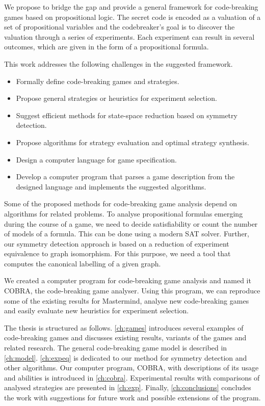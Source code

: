 We propose to bridge the gap and provide
  a general framework for code-breaking games
  based on propositional logic.
The secret code is encoded as a valuation of
  a set of propositional variables
  and the codebreaker's goal is to discover the valuation
  through a series of experiments.
Each experiment can result in several outcomes,
  which are given in the form of a propositional formula.

This work addresses the following challenges in the suggested framework.
\begin{itemize}
\item Formally define code-breaking games and strategies.
\item Propose general strategies or heuristics for experiment selection.
\item Suggest efficient methods for state-space reduction based on symmetry detection.
\item Propose algorithms for strategy evaluation and optimal strategy synthesis.
\item Design a computer language for game specification.
\item Develop a computer program that parses a game description from the
  designed language and implements the suggested algorithms.
\end{itemize}

Some of the proposed methods for code-breaking game analysis depend
  on algorithms for related problems.
To analyse propositional formulas emerging during the course of a game,
  we need to decide satisfiability or count the number of models of
  a formula. This can be done using a modern SAT solver.
Further, our symmetry detection approach is based on a reduction
  of experiment equivalence to graph isomorphism.
For this purpose, we need a tool that computes the canonical labelling of a
 given graph.

We created a computer program for code-breaking game analysis and named it COBRA,
  the code-breaking game analyser.
Using this program, we can reproduce some of the existing results
  for Mastermind, analyse new code-breaking games and easily evaluate new heuristics
  for experiment selection.

The thesis is structured as follows.
\autoref{ch:games} introduces several examples of code-breaking games and
  discusses existing results, variants of the games and related research.
The general code-breaking game model is described in \autoref{ch:model}.
\autoref{ch:expeq} is dedicated to our method for symmetry detection and other algorithms.
Our computer program, COBRA, with descriptions of its usage and
  abilities is introduced in \autoref{ch:cobra}.
Experimental results with comparisons of analysed strategies
  are presented in \autoref{ch:exp}.
Finally, \autoref{ch:conclusions} concludes the work with suggestions for future work
  and possible extensions of the program.






